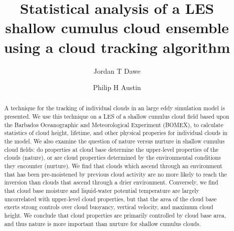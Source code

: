\documentclass[acp]{copernicus}
\begin{document}
\title{Statistical analysis of a LES shallow cumulus cloud ensemble using a 
cloud tracking algorithm}


\author[1]{Jordan T Dawe}
\author[1]{Philip H Austin}










\received{}
\pubdiscuss{} %
\revised{}
\accepted{}
\published{}




\maketitle



\begin{abstract}
A technique for the tracking of individual clouds in an large eddy 
simulation model is presented.  We use this technique on a LES of a 
shallow cumulus cloud field based upon the Barbados Oceanographic and 
Meteorological Experiment (BOMEX), to calculate statistics of cloud 
height, lifetime, and other physical properies for individual clouds 
in the model.  We also examine the question of nature versus nurture 
in shallow cumulus cloud fields: do properties at cloud base determine 
the upper-level properties of the clouds (nature), or are cloud properties 
determined by the environmental conditions they encounter (nurture).  
We find that clouds which ascend through an environment that has been 
pre-moistened by previous cloud activity are no more likely to reach 
the inversion than clouds that ascend through a drier environment.  
Conversely, we find that cloud base moisture and liquid-water potential 
temperature are largely uncorrelated with upper-level cloud properties, 
but that the area of the cloud base exerts strong controls over cloud 
buoyancy, vertical velocity, and maximum cloud height.  We conclude 
that cloud properties are primarily controlled by cloud base area, and thus
nature is more important than nurture for shallow cumulus clouds.
\end{abstract}
\end{document}
